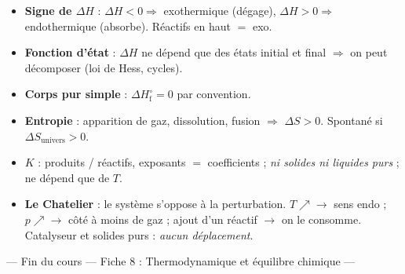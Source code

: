 \documentclass[11pt,a4paper]{article}
\newcommand{\dH}{\Delta H}
\newcommand{\dHf}{\Delta H^{\circ}_{\text{f}}}
\newcommand{\dS}{\Delta S}
\begin{document}
\begin{tcolorbox}[boxbase,colback=thmcol!5,colframe=thmcol,
   title={\textsc{Les réflexes à retenir}}]
\begin{itemize}[leftmargin=1.6em,topsep=2pt,itemsep=3pt]
  \item \textbf{Signe de $\dH$} : $\dH<0 \Rightarrow$ exothermique (dégage), $\dH>0 \Rightarrow$
        endothermique (absorbe). Réactifs en haut $=$ exo.
  \item \textbf{Fonction d'état} : $\dH$ ne dépend que des états initial et final $\Rightarrow$ on peut
        décomposer (loi de Hess, cycles).
  \item \textbf{Corps pur simple} : $\dHf = 0$ par convention.
  \item \textbf{Entropie} : apparition de gaz, dissolution, fusion $\Rightarrow$ $\dS > 0$. Spontané si
        $\dS_{\text{univers}} > 0$.
  \item \textbf{$K$} : produits / réactifs, exposants $=$ coefficients ; \emph{ni solides ni liquides
        purs} ; ne dépend que de $T$.
  \item \textbf{Le Chatelier} : le système s'oppose à la perturbation. $T\nearrow \to$ sens endo ;
        $p\nearrow \to$ côté à moins de gaz ; ajout d'un réactif $\to$ on le consomme. Catalyseur et
        solides purs : \emph{aucun déplacement}.
\end{itemize}
\end{tcolorbox}

\vfill
\begin{center}
{\small\color{black!55}— Fin du cours — Fiche 8 : Thermodynamique et équilibre chimique —}
\end{center}
\end{document}
